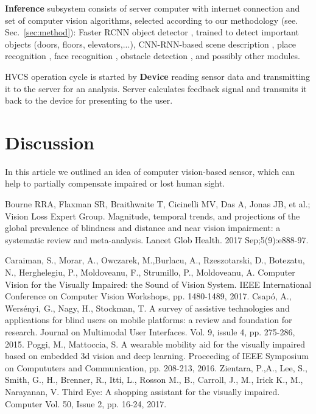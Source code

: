 \documentclass[a4paper,11pt]{article}
\begin{document}
\textbf{Inference} subsystem consists of server computer with internet connection and set of computer vision algorithms, selected according to our methodology (see. Sec.~\ref{sec:method}): Faster RCNN object detector \cite{?}, trained to detect important objects (doors, floors, elevators,...), CNN-RNN-based scene description \cite{?}, place recognition \cite{?}, face recognition \cite{?}, obstacle detection \cite{?}, and possibly other modules. 

HVCS operation cycle is started by \textbf{Device} reading sensor data and transmitting it to the server for an analysis. Server calculates feedback signal and transmits it back to the device for presenting to the user.


\section{Discussion}
\label{sec:discussion}

In this article we outlined an idea of computer vision-based sensor, which can help to partially compensate impaired or lost human sight. 


\begin{thebibliography}{1}


 Bourne RRA, Flaxman SR, Braithwaite T, Cicinelli MV, Das A, Jonas JB, et al.; Vision Loss Expert Group. Magnitude, temporal trends, and projections of the global prevalence of blindness and distance and near vision impairment: a systematic review and meta-analysis. Lancet Glob Health.  2017 Sep;5(9):e888-97.

 Caraiman, S., Morar, A., Owczarek, M.,Burlacu, A., Rzeszotarski, D., Botezatu, N., Herghelegiu, P., Moldoveanu, F., Strumillo, P., Moldoveanu, A. Computer Vision for the Visually Impaired: the Sound of Vision System. IEEE International Conference on Computer Vision Workshops, pp. 1480-1489, 2017.
 Csap\'{o}, A., Wers\'{e}nyi, G., Nagy, H., Stockman, T. A survey of assistive technologies and applications for blind users on mobile platforms: a review and foundation for research. Journal on Multimodal User Interfaces. Vol. 9, issule 4,  pp. 275-286, 2015.
 Poggi, M., Mattoccia, S. A wearable mobility aid for the visually impaired based on embedded 3d vision and deep learning. Proceeding of IEEE Symposium on Compututers and Communication, pp. 208-213, 2016.
 Zientara, P.,A., Lee, S., Smith, G., H., Brenner, R., Itti, L., Rosson M., B., Carroll, J., M., Irick K., M., Narayanan, V. Third Eye: A shopping assistant for the visually impaired. Computer Vol. 50, Issue 2, pp. 16-24, 2017.


\end{thebibliography}
\end{document}
